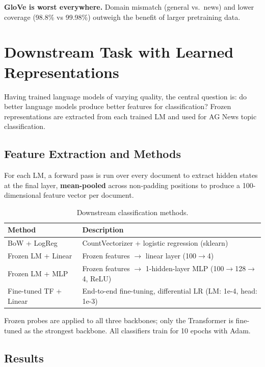 \documentclass[11pt]{article}
\begin{document}
\textbf{GloVe is worst everywhere.} Domain mismatch (general vs.\ news) and lower coverage (98.8\% vs 99.98\%) outweigh the benefit of larger pretraining data.

\section{Downstream Task with Learned Representations}

Having trained language models of varying quality, the central question is: do better language models produce better features for classification? Frozen representations are extracted from each trained LM and used for AG News topic classification.

\subsection{Feature Extraction and Methods}

For each LM, a forward pass is run over every document to extract hidden states at the final layer, \textbf{mean-pooled} across non-padding positions to produce a 100-dimensional feature vector per document.

\begin{table}[H]
\centering\small
\begin{tabular}{ll}
\toprule
\textbf{Method} & \textbf{Description} \\
\midrule
BoW + LogReg & CountVectorizer + logistic regression (sklearn) \\
Frozen LM + Linear & Frozen features $\rightarrow$ linear layer (100$\rightarrow$4) \\
Frozen LM + MLP & Frozen features $\rightarrow$ 1-hidden-layer MLP (100$\rightarrow$128$\rightarrow$4, ReLU) \\
Fine-tuned TF + Linear & End-to-end fine-tuning, differential LR (LM: 1e-4, head: 1e-3) \\
\bottomrule
\end{tabular}
\caption{Downstream classification methods.}
\label{tab:methods}
\end{table}

Frozen probes are applied to all three backbones; only the Transformer is fine-tuned as the strongest backbone. All classifiers train for 10 epochs with Adam.

\subsection{Results}
\end{document}
